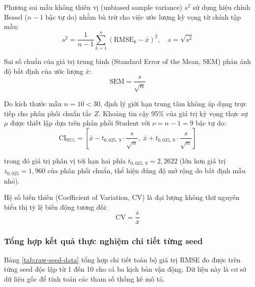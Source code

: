 Phương sai mẫu không thiên vị (unbiased sample variance) $s^2$ sử dụng hiệu chỉnh Bessel ($n-1$ bậc tự do) nhằm bù trừ cho việc ước lượng kỳ vọng từ chính tập mẫu:
\begin{equation}
s^2 = \frac{1}{n - 1} \sum_{k=1}^{n} \left(\text{RMSE}_k - \bar{x}\right)^2, \quad s = \sqrt{s^2}
\label{eq:sample-std}
\end{equation}

Sai số chuẩn của giá trị trung bình (Standard Error of the Mean, SEM) phản ánh độ bất định của ước lượng $\bar{x}$:
\begin{equation}
\text{SEM} = \frac{s}{\sqrt{n}}
\label{eq:sem}
\end{equation}

Do kích thước mẫu $n = 10 < 30$, định lý giới hạn trung tâm không áp dụng trực tiếp cho phân phối chuẩn tắc $Z$. Khoảng tin cậy 95\% của giá trị kỳ vọng thực sự $\mu$ được thiết lập dựa trên phân phối Student với $\nu = n - 1 = 9$ bậc tự do:
\begin{equation}
\text{CI}_{95\%} = \left[ \bar{x} - t_{0{,}025, \, 9} \cdot \frac{s}{\sqrt{n}}, \; \bar{x} + t_{0{,}025, \, 9} \cdot \frac{s}{\sqrt{n}} \right]
\label{eq:confidence-interval}
\end{equation}

trong đó giá trị phân vị tới hạn hai phía $t_{0{,}025, \, 9} = 2{,}2622$ (lớn hơn giá trị $z_{0{,}025} = 1{,}960$ của phân phối chuẩn, thể hiện đúng độ mở rộng do bất định mẫu nhỏ).

Hệ số biến thiên (Coefficient of Variation, CV) là đại lượng không thứ nguyên biểu thị tỷ lệ biến động tương đối:
\begin{equation}
\text{CV} = \frac{s}{\bar{x}}
\label{eq:cv-formula}
\end{equation}

\subsubsection{Tổng hợp kết quả thực nghiệm chi tiết từng seed}

\hspace{0.5cm} Bảng \ref{tab:raw-seed-data} tổng hợp chi tiết toàn bộ giá trị RMSE đo được trên từng seed độc lập từ 1 đến 10 cho cả ba kịch bản vận động. Dữ liệu này là cơ sở dữ liệu gốc để tính toán các tham số thống kê mô tả.


